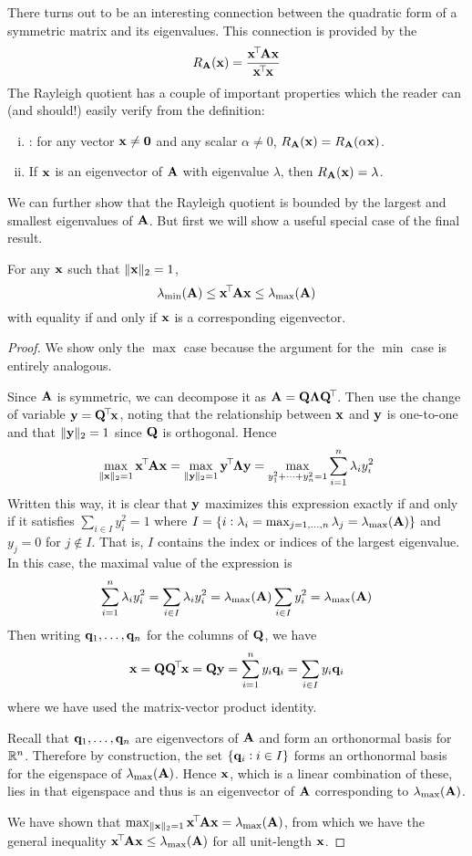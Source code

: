 There turns out to be an interesting connection between the quadratic form of a symmetric matrix and its eigenvalues.
This connection is provided by the 
\[R_{\mathbf{A}}(\mathbf{x}) = \frac{\mathbf{x}^{\!\top\!}\mathbf{A}\mathbf{x}}{\mathbf{x}^{\!\top\!}\mathbf{x}}\]
The Rayleigh quotient has a couple of important properties which the reader can (and should!) easily verify from the definition:
\begin{enumerate}[(i)]
\item {}: for any vector $\mathbf{x} \neq \mathbf{0}$ and any scalar $\alpha \neq 0$, $R_{\mathbf{A}}(\mathbf{x}) = R_{\mathbf{A}}(\alpha\mathbf{x})$.
\item If $\mathbf{x}$ is an eigenvector of $\mathbf{A}$ with eigenvalue $\lambda$, then $R_{\mathbf{A}}(\mathbf{x}) = \lambda$.
\end{enumerate}
We can further show that the Rayleigh quotient is bounded by the largest and smallest eigenvalues of $\mathbf{A}$.
But first we will show a useful special case of the final result.
\begin{proposition}
For any $\mathbf{x}$ such that $\|\mathbf{x}\|_2 = 1$,
\[\lambda_{\min}(\mathbf{A}) \leq \mathbf{x}^{\!\top\!}\mathbf{A}\mathbf{x} \leq \lambda_{\max}(\mathbf{A})\]
with equality if and only if $\mathbf{x}$ is a corresponding eigenvector.
\end{proposition}
\begin{proof}
We show only the $\max$ case because the argument for the $\min$ case is entirely analogous.

Since $\mathbf{A}$ is symmetric, we can decompose it as $\mathbf{A} = \mathbf{Q}\mathbf{\Lambda}\mathbf{Q}^{\!\top\!}$.
Then use the change of variable $\mathbf{y} = \mathbf{Q}^{\!\top\!}\mathbf{x}$, noting that the relationship between $\mathbf{x}$ and $\mathbf{y}$ is one-to-one and that $\|\mathbf{y}\|_2 = 1$ since $\mathbf{Q}$ is orthogonal.
Hence
\[\max_{\|\mathbf{x}\|_2 = 1} \mathbf{x}^{\!\top\!}\mathbf{A}\mathbf{x} = \max_{\|\mathbf{y}\|_2 = 1} \mathbf{y}^{\!\top\!}\mathbf{\Lambda}\mathbf{y} = \max_{y_1^2+\dots+y_n^2=1} \sum_{i=1}^n \lambda_i y_i^2\]
Written this way, it is clear that $\mathbf{y}$ maximizes this expression exactly if and only if it satisfies $\sum_{i \in I} y_i^2 = 1$ where $I = \{i : \lambda_i = \max_{j=1,\dots,n} \lambda_j = \lambda_{\max}(\mathbf{A})\}$ and $y_j = 0$ for $j \not\in I$.
That is, $I$ contains the index or indices of the largest eigenvalue.
In this case, the maximal value of the expression is
\[\sum_{i=1}^n \lambda_i y_i^2 = \sum_{i \in I} \lambda_i y_i^2 = \lambda_{\max}(\mathbf{A}) \sum_{i \in I} y_i^2 = \lambda_{\max}(\mathbf{A})\]
Then writing $\mathbf{q}_1, \dots, \mathbf{q}_n$ for the columns of $\mathbf{Q}$, we have
\[\mathbf{x} = \mathbf{Q}\mathbf{Q}^{\!\top\!}\mathbf{x} = \mathbf{Q}\mathbf{y} = \sum_{i=1}^n y_i\mathbf{q}_i = \sum_{i \in I} y_i\mathbf{q}_i\]
where we have used the matrix-vector product identity.

Recall that $\mathbf{q}_1, \dots, \mathbf{q}_n$ are eigenvectors of $\mathbf{A}$ and form an orthonormal basis for $\mathbb{R}^n$.
Therefore by construction, the set $\{\mathbf{q}_i : i \in I\}$ forms an orthonormal basis for the eigenspace of $\lambda_{\max}(\mathbf{A})$.
Hence $\mathbf{x}$, which is a linear combination of these, lies in that eigenspace and thus is an eigenvector of $\mathbf{A}$ corresponding to $\lambda_{\max}(\mathbf{A})$.

We have shown that $\max_{\|\mathbf{x}\|_2 = 1} \mathbf{x}^{\!\top\!}\mathbf{A}\mathbf{x} = \lambda_{\max}(\mathbf{A})$, from which we have the general inequality $\mathbf{x}^{\!\top\!}\mathbf{A}\mathbf{x} \leq \lambda_{\max}(\mathbf{A})$ for all unit-length $\mathbf{x}$.
\end{proof}
